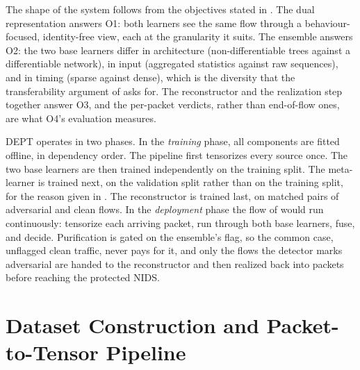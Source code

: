 The shape of the system follows from the objectives stated in
. The dual representation answers O1: both learners see the
same flow through a behaviour-focused, identity-free view, each at the granularity it
suits. The ensemble answers O2: the two base learners differ in architecture
(non-differentiable trees against a differentiable network), in input (aggregated
statistics against raw sequences), and in timing (sparse against dense), which is the
diversity that the transferability argument of  asks for. The
reconstructor and the realization step together answer O3, and the per-packet verdicts,
rather than end-of-flow ones, are what O4's evaluation measures.

DEPT operates in two phases. In the \emph{training} phase, all components are fitted
offline, in dependency order. The pipeline first tensorizes every source once. The two
base learners are then trained independently on the training split. The meta-learner is
trained next, on the validation split rather than on the training split, for the reason
given in . The reconstructor is trained last, on matched pairs of
adversarial and clean flows. In the \emph{deployment} phase the flow of
 would run continuously: tensorize each arriving packet, run
through both base learners, fuse, and decide. Purification is gated on the ensemble's
flag, so the common case, unflagged clean traffic, never pays for it, and only the flows
the detector marks adversarial are handed to the reconstructor and then realized back
into packets before reaching the protected NIDS.

\section{Dataset Construction and Packet-to-Tensor Pipeline}\label{sec:sol-pipeline}

